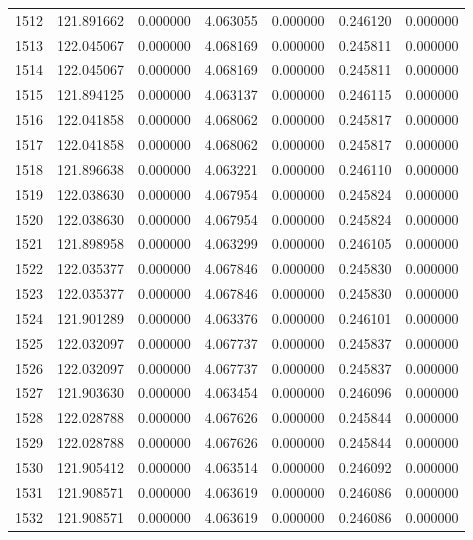 \begin{tabular}{rrrrrrr}
1512 & 121.891662 &    0.000000 &  4.063055 &   0.000000 &   0.246120 &  0.000000 \\
1513 & 122.045067 &    0.000000 &  4.068169 &   0.000000 &   0.245811 &  0.000000 \\
1514 & 122.045067 &    0.000000 &  4.068169 &   0.000000 &   0.245811 &  0.000000 \\
1515 & 121.894125 &    0.000000 &  4.063137 &   0.000000 &   0.246115 &  0.000000 \\
1516 & 122.041858 &    0.000000 &  4.068062 &   0.000000 &   0.245817 &  0.000000 \\
1517 & 122.041858 &    0.000000 &  4.068062 &   0.000000 &   0.245817 &  0.000000 \\
1518 & 121.896638 &    0.000000 &  4.063221 &   0.000000 &   0.246110 &  0.000000 \\
1519 & 122.038630 &    0.000000 &  4.067954 &   0.000000 &   0.245824 &  0.000000 \\
1520 & 122.038630 &    0.000000 &  4.067954 &   0.000000 &   0.245824 &  0.000000 \\
1521 & 121.898958 &    0.000000 &  4.063299 &   0.000000 &   0.246105 &  0.000000 \\
1522 & 122.035377 &    0.000000 &  4.067846 &   0.000000 &   0.245830 &  0.000000 \\
1523 & 122.035377 &    0.000000 &  4.067846 &   0.000000 &   0.245830 &  0.000000 \\
1524 & 121.901289 &    0.000000 &  4.063376 &   0.000000 &   0.246101 &  0.000000 \\
1525 & 122.032097 &    0.000000 &  4.067737 &   0.000000 &   0.245837 &  0.000000 \\
1526 & 122.032097 &    0.000000 &  4.067737 &   0.000000 &   0.245837 &  0.000000 \\
1527 & 121.903630 &    0.000000 &  4.063454 &   0.000000 &   0.246096 &  0.000000 \\
1528 & 122.028788 &    0.000000 &  4.067626 &   0.000000 &   0.245844 &  0.000000 \\
1529 & 122.028788 &    0.000000 &  4.067626 &   0.000000 &   0.245844 &  0.000000 \\
1530 & 121.905412 &    0.000000 &  4.063514 &   0.000000 &   0.246092 &  0.000000 \\
1531 & 121.908571 &    0.000000 &  4.063619 &   0.000000 &   0.246086 &  0.000000 \\
1532 & 121.908571 &    0.000000 &  4.063619 &   0.000000 &   0.246086 &  0.000000 \\

\end{tabular}

